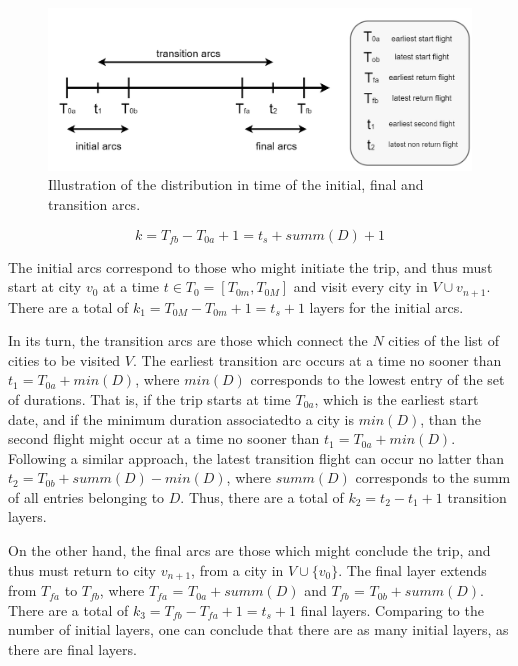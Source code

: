 \begin{figure}[htpb]
  \centering
  \includegraphics[width=\textwidth]{./Figures/system_design/flights_times.png}
  \caption{Illustration of the distribution in time of the initial, final and transition arcs.}
  \label{fig:multipartite_times}  
\end{figure}


\begin{equation}
\label{eq:k_number_layers}
  k = T_{fb} - T_{0a} + 1 = t_s + summ(D) + 1
\end{equation}

The initial arcs correspond to those who might initiate the trip,
and thus must start at city $v_0$ at a time $t \in T_0 = [T_{0m}, T_{0M}]$
and visit every city in $V \cup {v_{n+1}}$.
There are a total of $k_1 = T_{0M} - T_{0m} + 1 = t_s + 1$ layers for the initial arcs.

In its turn, the transition arcs are those which connect the $N$ cities 
of the list of cities to be visited $V$.
The earliest transition arc occurs at a time no sooner than $t_1 = T_{0a} + min(D)$,
where $min(D)$ corresponds to the lowest entry of the set of durations.
That is, if the trip starts at time $T_{0a}$, which is the earliest start date,
and if the minimum duration associatedto a city is $min(D)$, 
than the second flight might occur at a time no sooner than $t_1 = T_{0a} + min(D)$.
Following a similar approach, the latest transition flight can 
occur no latter than $t_2 = T_{0b} + summ(D) - min(D)$, where $summ(D)$ corresponds 
to the summ of all entries belonging to $D$.
Thus, there are a total of $k_2 = t_2-t_1+1$ transition layers.

On the other hand, the final arcs are those which might conclude the trip,
and thus must return to city $v_{n+1}$,
from a city in $V \cup \{v_0\}$. The final layer extends from 
$T_{fa}$ to $T_{fb}$, where $T_{fa}$ = $T_{0a} + summ(D)$ and $T_{fb}$ = $T_{0b} + summ(D)$.
There are a total of $k_3 = T_{fb} - T_{fa} + 1 = t_s + 1 $ final layers.
Comparing to the number of initial layers, one can conclude that there are as many 
initial layers, as there are final layers. 


